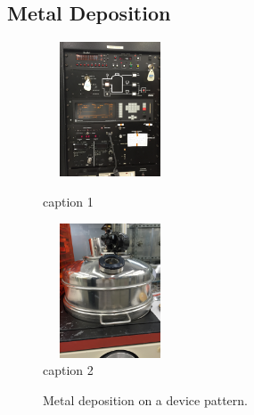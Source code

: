 \subsection{Metal Deposition}\label{subsec:deposition}
\begin{figure}[ht]
	\centering
	\begin{minipage}[b]{0.45\linewidth}
		\centering
		\includegraphics[height=4cm,width=4cm]{figs/experimental/bjd_control_panel}
		\caption[BJD control panel]{caption 1}
		\label{fig:bjd_control_panel}
	\end{minipage}
	\qquad
	\begin{minipage}[b]{0.45\linewidth}
		\centering
		\includegraphics[height=4cm,width=4cm]{figs/experimental/bjd_hood}
		\caption[BJD Hood]{caption 2}
		\label{fig:bjd_hood}
	\end{minipage}
\end{figure}

\begin{figure}[ht]
	\centering
	\qquad
	\caption[/ deposited on device]{Metal deposition on a device pattern.}
\end{figure}


